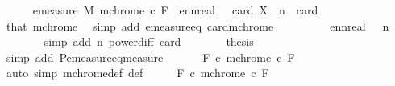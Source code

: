 \begin{isabellebody}
\ \ \ \ \isamarkupfalse%
\ {\isachardoublequoteopen}emeasure\ M\ {\isacharparenleft}{\kern0pt}mchrome\ c\ F{\isacharparenright}{\kern0pt}\ {\isacharequal}{\kern0pt}\ ennreal\ {\isacharparenleft}{\kern0pt}{}\ {\isacharcircum}{\kern0pt}\ {\isacharparenleft}{\kern0pt}card\ X\ {\isacharminus}{\kern0pt}\ n{\isacharparenright}{\kern0pt}\ {\isacharslash}{\kern0pt}\ card\ {\isasymOmega}{\isacharparenright}{\kern0pt}{\isachardoublequoteclose}\isanewline
\ \ \ \ \ \ \isamarkupfalse%
\ that\ mchrome\ \isamarkupfalse%
\ {\isacharparenleft}{\kern0pt}simp\ add{\isacharcolon}{\kern0pt}\ emeasure{\isacharunderscore}{\kern0pt}eq\ card{\isacharunderscore}{\kern0pt}mchrome{\isacharparenright}{\kern0pt}\isanewline
\ \ \ \ \isamarkupfalse%
\ \isamarkupfalse%
\ {\isachardoublequoteopen}{\isasymdots}\ {\isacharequal}{\kern0pt}\ ennreal\ {\isacharparenleft}{\kern0pt}{}\ {\isacharslash}{\kern0pt}\ {}{\isacharcircum}{\kern0pt}n{\isacharparenright}{\kern0pt}{\isachardoublequoteclose}\isanewline
\ \ \ \ \ \ \isamarkupfalse%
\ {\isacharparenleft}{\kern0pt}simp\ add{\isacharcolon}{\kern0pt}\ n\ power{\isacharunderscore}{\kern0pt}diff\ card{\isasymOmega}{\isacharparenright}{\kern0pt}\isanewline
\ \ \ \ \isamarkupfalse%
\ \isamarkupfalse%
\ {\isacharquery}{\kern0pt}thesis\isanewline
\ \ \ \ \ \ \isamarkupfalse%
\ {\isacharparenleft}{\kern0pt}simp\ add{\isacharcolon}{\kern0pt}\ P{\isachardot}{\kern0pt}emeasure{\isacharunderscore}{\kern0pt}eq{\isacharunderscore}{\kern0pt}measure{\isacharparenright}{\kern0pt}\isanewline
\ \ \isamarkupfalse%
\isanewline
\isanewline
\ \ \isamarkupfalse%
\ {\isachardoublequoteopen}{\isacharparenleft}{\kern0pt}{\isasymUnion}F{\isasymin}{\isasymF}{\isachardot}{\kern0pt}\ {\isasymUnion}c{\isacharless}{\kern0pt}{}{\isachardot}{\kern0pt}\ mchrome\ c\ F{\isacharparenright}{\kern0pt}\ {\isasymsubseteq}\ {\isasymOmega}{\isachardoublequoteclose}\isanewline
\ \ \ \ \isamarkupfalse%
\ {\isacharparenleft}{\kern0pt}auto\ simp{\isacharcolon}{\kern0pt}\ mchrome{\isacharunderscore}{\kern0pt}def\ {\isasymOmega}{\isacharunderscore}{\kern0pt}def{\isacharparenright}{\kern0pt}\isanewline
\ \ \isamarkupfalse%
\ \isamarkupfalse%
\ {\isachardoublequoteopen}{\isacharparenleft}{\kern0pt}{\isasymUnion}F{\isasymin}{\isasymF}{\isachardot}{\kern0pt}\ {\isasymUnion}c{\isacharless}{\kern0pt}{}{\isachardot}{\kern0pt}\ mchrome\ c\ F{\isacharparenright}{\kern0pt}\ {\isasymnoteq}\ {\isasymOmega}{\isachardoublequoteclose}\isanewline

\end{isabellebody}
